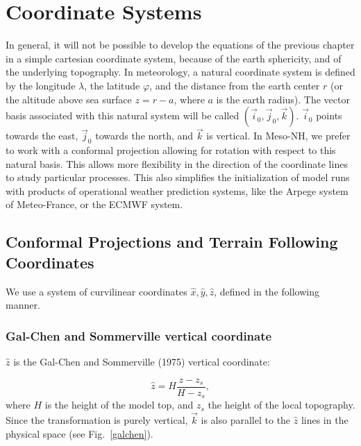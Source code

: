 \chapter{Coordinate Systems}
\minitoc


In general, it will not be possible to develop the equations of the previous
chapter in a simple cartesian coordinate system, because
of the earth sphericity, and of the underlying topography.
In meteorology, a natural coordinate system is defined by the longitude
$\lambda$, the latitude $\varphi$, and the distance from the earth center $r$
(or the altitude above sea surface $z=r-a$, where $a$ is the earth radius).
The vector basis associated with this natural system will be called
$(\vec{i}_0, \vec{j}_0,\vec{k})$. $\vec{i}_0$ points towards the east,
$\vec{j}_0$ towards the north, and $\vec{k}$ is vertical.
In Meso-NH, we prefer to work with a conformal
projection allowing for rotation with respect to this natural basis.
This allows more flexibility in the direction of the coordinate lines
to study particular processes. This also simplifies the initialization
of model runs with products of operational weather prediction systems,
like the Arpege system of Meteo-France, or the ECMWF system.

\section{Conformal Projections and Terrain Following Coordinates}

We use a system of curvilinear coordinates $\widehat{x},\widehat{y},
\widehat{z}$, defined in the following manner.

\subsection{Gal-Chen and Sommerville vertical coordinate}

$\widehat{z}$ is
the Gal-Chen and Sommerville (1975) vertical coordinate:

\begin{equation}
\widehat{z} =H  \dfrac{z - z_{s}}{H - z_{s} },
\end{equation}
where $H$ is the height of the model top, and  $z_{s}$ the height of the
local topography. Since the transformation is purely vertical, $\vec{k}$
is also parallel to the $\widehat{z}$ lines in the physical space
(see Fig.~\ref{galchen}).

